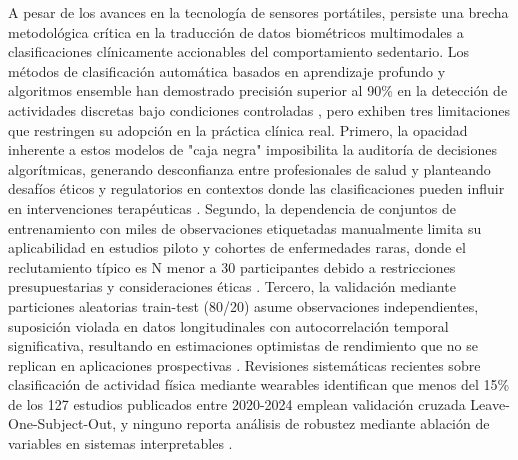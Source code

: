 
A pesar de los avances en la tecnología de sensores portátiles, persiste una brecha metodológica crítica en la traducción de datos biométricos multimodales a clasificaciones clínicamente accionables del comportamiento sedentario. Los métodos de clasificación automática basados en aprendizaje profundo y algoritmos ensemble han demostrado precisión superior al 90\% en la detección de actividades discretas bajo condiciones controladas \cite{Khan2024,Chatterjee2024}, pero exhiben tres limitaciones que restringen su adopción en la práctica clínica real. Primero, la opacidad inherente a estos modelos de "caja negra" imposibilita la auditoría de decisiones algorítmicas, generando desconfianza entre profesionales de salud y planteando desafíos éticos y regulatorios en contextos donde las clasificaciones pueden influir en intervenciones terapéuticas \cite{Escalante2023}. Segundo, la dependencia de conjuntos de entrenamiento con miles de observaciones etiquetadas manualmente limita su aplicabilidad en estudios piloto y cohortes de enfermedades raras, donde el reclutamiento típico es N menor a 30 participantes debido a restricciones presupuestarias y consideraciones éticas \cite{Farrahi2024}. Tercero, la validación mediante particiones aleatorias train-test (80/20) asume observaciones independientes, suposición violada en datos longitudinales con autocorrelación temporal significativa, resultando en estimaciones optimistas de rendimiento que no se replican en aplicaciones prospectivas \cite{Varoquaux2017,Poldrack2020}. Revisiones sistemáticas recientes sobre clasificación de actividad física mediante wearables identifican que menos del 15\% de los 127 estudios publicados entre 2020-2024 emplean validación cruzada Leave-One-Subject-Out, y ninguno reporta análisis de robustez mediante ablación de variables en sistemas interpretables \cite{Giurgiu2024}.


